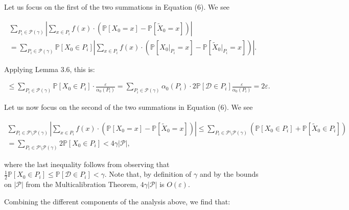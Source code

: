Let us focus on the first of the two summations in Equation (6). We see\par


\[\begin{gathered}
\displaystyle\sum_{P_{i}\in\mathcal{P}(\gamma)}\left|\sum_{x\in P_{i}}f(x)\cdot\left(\mathbb{P}[X_{0}=x]-\mathbb{P}[\widetilde{X}_{0}=x]\right)\right| \\
\displaystyle=\sum_{P_{i}\in\mathcal{P}(\gamma)}\mathbb{P}[X_{0}\in P_{i}]\left|\sum_{x\in P_{i}}f(x)\cdot\left(\mathbb{P}[X_{0}|_{P_{i}}=x]-\mathbb{P}[\widetilde{X}_{0}|_{P_{i}}=x]\right)\right|.
\end{gathered}\]


Applying Lemma 3.6, this is:\par


\[\begin{gathered}
\leq\sum_{P_{i}\in\mathcal{P}(\gamma)}\mathbb{P}[X_{0}\in P_{i}]\cdot\frac{\varepsilon}{\alpha_{0}(P_{i})}=\sum_{P_{i}\in\mathcal{P}(\gamma)}\alpha_{0}(P_{i})\cdot 2\mathbb{P}[\mathcal{D}\in P_{i}]\frac{\varepsilon}{\alpha_{0}(P_{i})}=2\varepsilon.
\end{gathered}\]




Let us now focus on the second of the two summations in Equation (6). We see\par


\[\begin{gathered}
\displaystyle\sum_{P_{i}\in\mathcal{P}\setminus\mathcal{P}(\gamma)}\left|\sum_{x\in P_{i}}f(x)\cdot\left(\mathbb{P}[X_{0}=x]-\mathbb{P}[\widetilde{X}_{0}=x]\right)\right|\leq\sum_{P_{i}\in\mathcal{P}\setminus\mathcal{P}(\gamma)}\left(\mathbb{P}[X_{0}\in P_{i}]+\mathbb{P}[\widetilde{X}_{0}\in P_{i}]\right) \\
\displaystyle=\sum_{P_{i}\in\mathcal{P}\setminus\mathcal{P}(\gamma)}2\mathbb{P}[X_{0}\in P_{i}]<4\gamma|\mathcal{P}|,
\end{gathered}\]


where the last inequality follows from observing that $\frac{1}{2}\mathbb{P}[X_{0}\in P_{i}]\leq\mathbb{P}[\mathcal{D}\in P_{i}]<\gamma$. Note that, by definition of $\gamma$ and by the bounds on $|\mathcal{P}|$ from the Multicalibration Theorem, $4\gamma|\mathcal{P}|$ is $O(\varepsilon)$.\par




Combining the different components of the analysis above, we find that:\par


